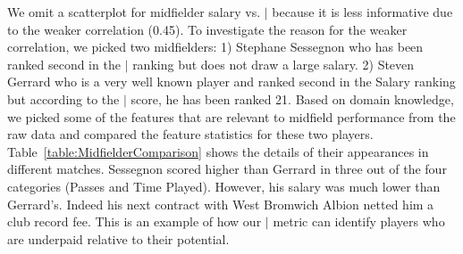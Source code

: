 {We omit a scatterplot for midfielder salary vs. $\mid$ because it is less informative due to the weaker  correlation (0.45).
%
To investigate the reason for the weaker correlation, we picked two midfielders: 1) Stephane Sessegnon  who has been ranked second in the $\mid$ ranking but does not draw a large salary.  2) Steven Gerrard who is a very well known player and ranked second in the Salary ranking but according to the $\mid$ score, he has been ranked 21. Based on domain knowledge, we picked some of the features that are relevant to midfield performance from the raw data and compared the feature statistics for these two players. Table~\ref{table:MidfielderComparison} shows the details of their appearances in different matches. Sessegnon scored higher than Gerrard in three out of the four categories (Passes and Time Played). However, his salary was much lower than Gerrard's. Indeed his next contract with West Bromwich Albion netted him a club record fee. This is an example of how our $\mid$ metric can identify players who are underpaid relative to their potential.
		\begin{table}[htbp]
			
			\centering
\end{table}}
